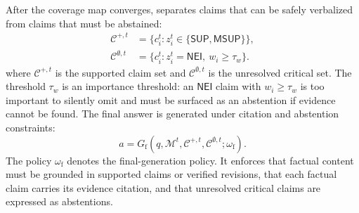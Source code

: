 After the coverage map converges, \ragname separates claims that can be safely verbalized from claims that must be abstained:
\begin{align}
    \mathcal{C}^{+,t}
    &=
    \{c_i^{t}: z_i^{t}\in\{\mathsf{SUP},\mathsf{MSUP}\}\}, \\
    \mathcal{C}^{\emptyset,t}
    &=
    \{c_i^{t}: z_i^{t}=\mathsf{NEI},\ w_i\geq \tau_w\}.
    \label{eq:framework_supported_unresolved}
\end{align}
where $\mathcal{C}^{+,t}$ is the supported claim set and $\mathcal{C}^{\emptyset,t}$ is the unresolved critical set. The threshold $\tau_w$ is an importance threshold: an $\mathsf{NEI}$ claim with $w_i\geq\tau_w$ is too important to silently omit and must be surfaced as an abstention if evidence cannot be found. The final answer is generated under citation and abstention constraints:
\begin{equation}
    a
    =
    G_{\mathrm{f}}
    (q,\mathcal{M}^{t},\mathcal{C}^{+,t},\mathcal{C}^{\emptyset,t};\omega_{\mathrm{f}}).
    \label{eq:framework_final_answer}
\end{equation}
The policy $\omega_{\mathrm{f}}$ denotes the final-generation policy. It enforces that factual content must be grounded in supported claims or verified revisions, that each factual claim carries its evidence citation, and that unresolved critical claims are expressed as abstentions.

